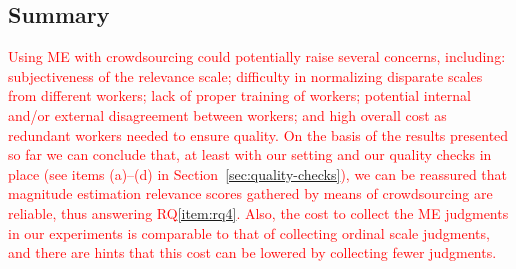 

\subsection{Summary}
\label{sec:summary-1}

\textcolor{red}{ 
Using ME with crowdsourcing could potentially raise
several concerns, including: 
subjectiveness of the relevance scale; 
difficulty in normalizing disparate scales from different workers; 
lack of proper training of workers;
potential internal and/or external disagreement between workers;
and high overall cost as redundant workers needed to ensure quality.
On the basis of the results presented so far we can conclude that, at
least with our setting and our quality checks in place (see items
(a)--(d) in Section~\ref{sec:quality-checks}), we can be reassured that
magnitude estimation relevance scores gathered by means of
crowdsourcing are reliable, thus answering RQ\ref{item:rq4}.
Also, the cost to collect the ME judgments in our experiments 
is comparable to that of collecting ordinal scale judgments, 
and there are hints that this cost can be lowered by collecting fewer judgments.
} 

